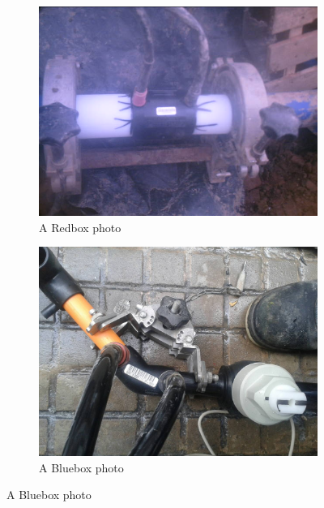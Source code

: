 \documentclass[a4paper,11pt]{article}
\begin{document}
\begin{figure}
    \centering
    \begin{minipage}[b]{\textwidth}
      \begin{subfigure}{.5\textwidth} 
        \centering
        \includegraphics[scale=0.34]{images/perfect3.jpg}
        \caption{A Redbox photo}\label{fig:2a}
      \end{subfigure}%
      \begin{subfigure}{.5\textwidth} 
        \centering
        \includegraphics[scale=0.17]{images/niceBluebox_100974.jpg}
        \caption{A Bluebox photo}\label{fig:2b}
      \end{subfigure} \par \vspace*{20pt} %
    \end{minipage}%
\label{f6}
\end{figure}
\end{document}
